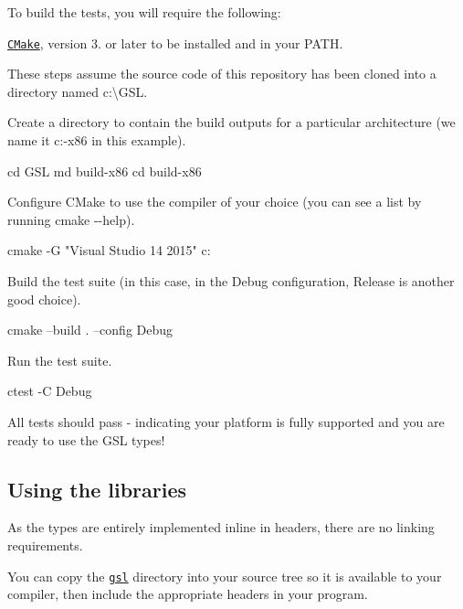 To build the tests, you will require the following\+:


\begin{DoxyItemize}
\item \href{http://cmake.org}{\tt C\+Make}, version 3. or later to be installed and in your P\+A\+TH.
\end{DoxyItemize}

These steps assume the source code of this repository has been cloned into a directory named {\ttfamily c\+:\textbackslash{}G\+SL}.


\begin{DoxyEnumerate}
\item Create a directory to contain the build outputs for a particular architecture (we name it c\+:-\/x86 in this example). \begin{DoxyVerb} cd GSL
 md build-x86
 cd build-x86
\end{DoxyVerb}

\item Configure C\+Make to use the compiler of your choice (you can see a list by running {\ttfamily cmake -\/-\/help}). \begin{DoxyVerb} cmake -G "Visual Studio 14 2015" c:\GSL
\end{DoxyVerb}

\item Build the test suite (in this case, in the Debug configuration, Release is another good choice). \begin{DoxyVerb} cmake --build . --config Debug
\end{DoxyVerb}

\item Run the test suite. \begin{DoxyVerb} ctest -C Debug
\end{DoxyVerb}

\end{DoxyEnumerate}

All tests should pass -\/ indicating your platform is fully supported and you are ready to use the G\+SL types!

\subsection*{Using the libraries}

As the types are entirely implemented inline in headers, there are no linking requirements.

You can copy the \href{./include/gsl}{\tt gsl} directory into your source tree so it is available to your compiler, then include the appropriate headers in your program.

